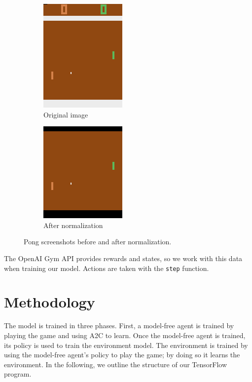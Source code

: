 \documentclass[10pt, twocolumn]{article}
\begin{document}
\begin{figure}[h]
\centering
\begin{subfigure}[b]{.2\textwidth}
  \centering
  \includegraphics[scale=0.5]{unnormalized}
  \caption{Original image}
  \label{fig:unnormalized}
\end{subfigure} 
\begin{subfigure}[b]{.2\textwidth}
  \centering
  \includegraphics[scale=0.5]{normalized}
  \caption{After normalization}
  \label{fig:normalized}
\end{subfigure} \hfill
\caption{Pong screenshots before and after normalization.}
\label{screenshots}
\end{figure}

The OpenAI Gym API provides rewards and states, so we work with this data when training our model.
Actions are taken with the \verb|step| function.

\section{Methodology}

The model is trained in three phases. First, a model-free agent is trained by playing the game and using
A2C to learn. Once the model-free agent is trained, its policy is used to train the environment model.
The environment is trained by using the model-free agent's policy to play the game; by doing so it learns the
environment. In the following, we outline the structure of our TensorFlow program.
\end{document}
